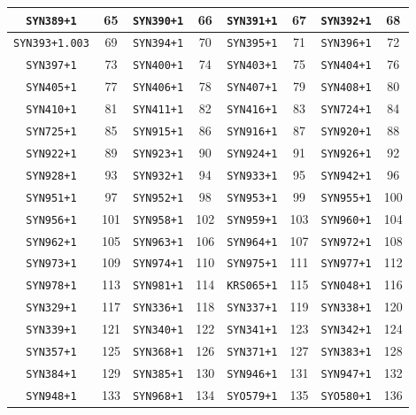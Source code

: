 \begin{table}[H]
{\begin{tabular}{|c|c|c|c|c|c|c|c|}
\hline
\texttt{SYN389+1} & 65 & \texttt{SYN390+1} & 66 & \texttt{SYN391+1} & 67 & \texttt{SYN392+1} & 68\\
\hline
\texttt{SYN393+1.003} & 69 & \texttt{SYN394+1} & 70 & \texttt{SYN395+1} & 71 & \texttt{SYN396+1} & 72\\
\hline
\texttt{SYN397+1} & 73 & \texttt{SYN400+1} & 74 & \texttt{SYN403+1} & 75 & \texttt{SYN404+1} & 76\\
\hline
\texttt{SYN405+1} & 77 & \texttt{SYN406+1} & 78 & \texttt{SYN407+1} & 79 & \texttt{SYN408+1} & 80\\
\hline
\texttt{SYN410+1} & 81 & \texttt{SYN411+1} & 82 & \texttt{SYN416+1} & 83 & \texttt{SYN724+1} & 84\\
\hline
\texttt{SYN725+1} & 85 & \texttt{SYN915+1} & 86 & \texttt{SYN916+1} & 87 & \texttt{SYN920+1} & 88\\
\hline
\texttt{SYN922+1} & 89 & \texttt{SYN923+1} & 90 & \texttt{SYN924+1} & 91 & \texttt{SYN926+1} & 92\\
\hline
\texttt{SYN928+1} & 93 & \texttt{SYN932+1} & 94 & \texttt{SYN933+1} & 95 & \texttt{SYN942+1} & 96\\
\hline
\texttt{SYN951+1} & 97 & \texttt{SYN952+1} & 98 & \texttt{SYN953+1} & 99 & \texttt{SYN955+1} & 100\\
\hline
\texttt{SYN956+1} & 101 & \texttt{SYN958+1} & 102 & \texttt{SYN959+1} & 103 & \texttt{SYN960+1} & 104\\
\hline
\texttt{SYN962+1} & 105 & \texttt{SYN963+1} & 106 & \texttt{SYN964+1} & 107 & \texttt{SYN972+1} & 108\\
\hline
\texttt{SYN973+1} & 109 & \texttt{SYN974+1} & 110 & \texttt{SYN975+1} & 111 & \texttt{SYN977+1} & 112\\
\hline
\texttt{SYN978+1} & 113 & \texttt{SYN981+1} & 114 & \texttt{KRS065+1} & 115 & \texttt{SYN048+1} & 116\\
\hline
\texttt{SYN329+1} & 117 & \texttt{SYN336+1} & 118 & \texttt{SYN337+1} & 119 & \texttt{SYN338+1} & 120\\
\hline
\texttt{SYN339+1} & 121 & \texttt{SYN340+1} & 122 & \texttt{SYN341+1} & 123 & \texttt{SYN342+1} & 124\\
\hline
\texttt{SYN357+1} & 125 & \texttt{SYN368+1} & 126 & \texttt{SYN371+1} & 127 & \texttt{SYN383+1} & 128\\
\hline
\texttt{SYN384+1} & 129 & \texttt{SYN385+1} & 130 & \texttt{SYN946+1} & 131 & \texttt{SYN947+1} & 132\\
\hline
\texttt{SYN948+1} & 133 & \texttt{SYN968+1} & 134 & \texttt{SYO579+1} & 135 & \texttt{SYO580+1} & 136\\
\hline
\end{tabular}
}
\end{table}


